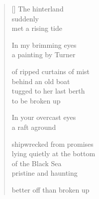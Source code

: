 \documentclass[12pt,a4paper]{article}
\begin{document}
\thispagestyle{empty}

\poemtitle{}

\settowidth{\versewidth}{tugged to her last berth}

\bigskip

\begin{verse}[\versewidth]
The hinterland \\
suddenly \\
met a rising tide

In my brimming eyes \\
a painting by Turner

of ripped curtains of mist \\
behind an old boat \\
tugged to her last berth \\
to be broken up

In your overcast eyes \\
a raft aground

shipwrecked from promises \\
lying quietly at the bottom \\
of the Black Sea \\
pristine and haunting

better off than broken up
\end{verse}
\end{document}
